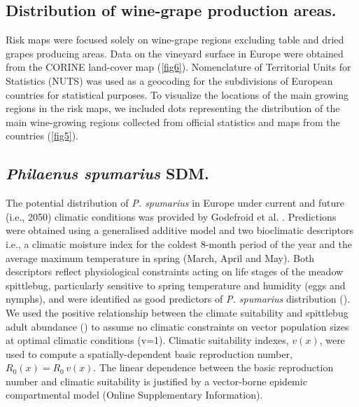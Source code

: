     \subsection{Distribution of wine-grape production areas.} Risk maps
    were
    focused solely on wine-grape regions excluding table and dried grapes
    producing
    areas. Data on the vineyard surface in Europe were obtained from the CORINE
    land-cover map \cite{Corine} (\cref{fig6}). Nomenclature of Territorial
    Units
    for Statistics (NUTS) was used as a geocoding for the subdivisions of
    European
    countries for statistical purposes. To visualize the locations of the main
    growing regions in the risk maps, we included dots representing the
    distribution of the main wine-growing regions collected from official
    statistics and maps from the countries (\cref{fig5}).

    \subsection{\textit{Philaenus spumarius} SDM.}
    The potential
    distribution
    of \textit{P. spumarius} in Europe under current and future (i.e., 2050)
    climatic conditions was provided by Godefroid et al. \cite{Godefroid2021}.
    Predictions were obtained using a generalised additive model and two
    bioclimatic descriptors i.e., a climatic moisture index for the coldest
    8-month
    period of the year and the average maximum temperature in spring (March,
    April
    and May). Both descriptors reflect physiological constraints acting on life
    stages of the meadow spittlebug, particularly sensitive to spring
    temperature
    and humidity (eggs and nymphs), and were identified as good predictors of
    \textit{P. spumarius} distribution (\cite{Godefroid2021}). We used the
    positive
    relationship between the climate suitability and spittlebug adult abundance
    (\cite{Godefroid2021}) to assume no climatic constraints on vector
    population
    sizes at optimal climatic conditions (v=1). Climatic suitability indexes,
$v(x)$, were used to compute a spatially-dependent basic reproduction number,
$R_0(x)=R_0\, v(x)$. The linear dependence between the basic reproduction
    number and climatic suitability is justified by a vector-borne epidemic
    compartmental model (Online Supplementary Information).
    \\

